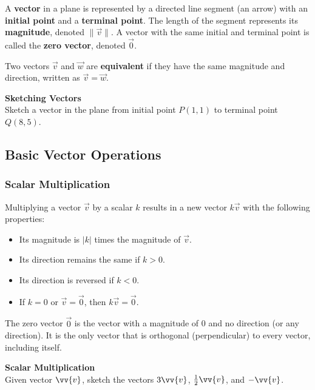 \documentclass{article}
\begin{document}
A \textbf{vector} in a plane is represented by a directed line segment (an arrow) with an \textbf{initial point} and a \textbf{terminal point}. The length of the segment represents its \textbf{magnitude}, denoted \(\|\vec{v}\|\). A vector with the same initial and terminal point is called the \textbf{zero vector}, denoted \(\vec{0}\).  

\noindent
Two vectors \(\vec{v}\) and \(\vec{w}\) are \textbf{equivalent} if they have the same magnitude and direction, written as \(\vec{v} = \vec{w}\).

\begin{exercisebox}
    \textbf{Sketching Vectors} \\
    Sketch a vector in the plane from initial point \(P(1, 1)\) to terminal point \(Q(8, 5)\).
\end{exercisebox}

\subsection*{Basic Vector Operations}

\subsubsection*{Scalar Multiplication}

Multiplying a vector \(\vec{v}\) by a scalar \(k\) results in a new vector \(k\vec{v}\) with the following properties:
\begin{itemize}[label=, left=2pt]
    \item Its magnitude is \(|k|\) times the magnitude of \(\vec{v}\).  
    \item Its direction remains the same if \(k > 0\).  
    \item Its direction is reversed if \(k < 0\).  
    \item If \(k = 0\) or \(\vec{v} = \vec{0}\), then \(k\vec{v} = \vec{0}\).  
\end{itemize}
\begin{notebox}
The zero vector \(\vec{0}\) is the vector with a magnitude of 0 and no direction (or any direction). 
It is the only vector that is orthogonal (perpendicular) to every vector, including itself.
\end{notebox}

\begin{exercisebox}
    \textbf{Scalar Multiplication} \\
    Given vector \(\vv{v}\), sketch the vectors \(3\vv{v}\), \(\frac{1}{2}\vv{v}\), and \(-\vv{v}\).
\end{exercisebox}
\end{document}
